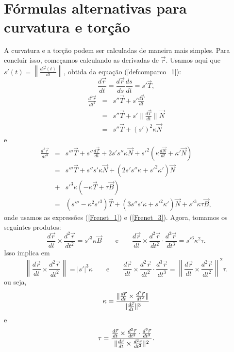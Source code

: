 \section{Fórmulas alternativas para curvatura e torção}
A curvatura e a torção podem ser calculadas de maneira mais simples. Para concluir isso, começamos calculando as derivadas de $\vec{r}$. Usamos aqui que $s'(t)=\left\|\frac{d\vec{r}(t)}{dt}\right\|$, obtida da equação (\ref{defcomparco_1}):
$$
\frac{d\vec{r}}{dt}=\frac{d\vec{r}}{ds}\frac{ds}{dt}=s' \vec{T},
$$
\begin{eqnarray*}
\frac{d^2\vec{r}}{dt^2}&=&s'' \vec{T}+s' \frac{d\vec{T}}{dt}\\&=&s'' \vec{T}+s' \|\frac{d\vec{T}}{dt}\|\vec{N}\\
&=&s'' \vec{T}+(s')^2 \kappa \vec{N}
\end{eqnarray*}
e
\begin{eqnarray*}
\frac{d^3\vec{r}}{dt^3}&=&s''' \vec{T}+s''\frac{d\vec{T}}{dt}+2s's''\kappa \vec{N}+s'^2 \left(\kappa \frac{d\vec{N}}{dt}+\kappa' \vec{N}\right)\\
&=&s''' \vec{T}+s''s'\kappa \vec{N}+\left(2s's''\kappa+s'^2\kappa'\right) \vec{N}\\
&+&s'^3 \kappa (-\kappa \vec{T}+\tau\vec{B})\\
&=&\left(s'''-\kappa^2s'^3\right) \vec{T}+\left(3s''s'\kappa +s'^2\kappa'\right)\vec{N}+s'^3 \kappa \tau\vec{B},
\end{eqnarray*}
onde usamos as expressões (\ref{Frenet_1}) e (\ref{Frenet_3}). Agora, tomamos os seguintes produtos:
$$
\frac{d\vec{r}}{dt} \times \frac{d^2 \vec{r}}{dt^2}=s'^3\kappa \vec{B}\qquad\text{e}\qquad
\frac{d\vec{r}}{dt} \times \frac{d^2\vec{r}}{dt^2} \cdot \frac{d^3\vec{r}}{dt^3}=s'^6\kappa^2\tau.
$$
Isso implica em
$$
\left\|\frac{d\vec{r}}{dt} \times \frac{d^2\vec{r}}{dt^2}\right\|=|s'|^3\kappa\qquad\text{e}\qquad
\frac{d\vec{r}}{dt} \times \frac{d^2\vec{r}}{dt^2} \cdot \frac{d^3 \vec{r}}{dt^3}=\left\|\frac{d\vec{r}}{dt} \times \frac{d^2\vec{r}}{dt^2}\right\|^2\tau.
$$
ou seja,
\begin{equation}{\label{curvatura_2}}
\kappa =\frac{\|\frac{d\vec{r}}{dt} \times \frac{d^2 \vec{r}}{dt^2}\|}{\|\frac{d\vec{r}}{dt}\|^3}
\end{equation}
e
\begin{equation}{\label{torcao_2}}
\tau=\frac{\frac{d\vec{r}}{dt} \times \frac{d^2 \vec{r}}{dt^2} \cdot \frac{d^3 \vec{r}}{dt^3} }{\|\frac{d\vec{r}}{dt} \times \frac{d^2\vec{r}}{dt^2}\|^2}.
\end{equation}

